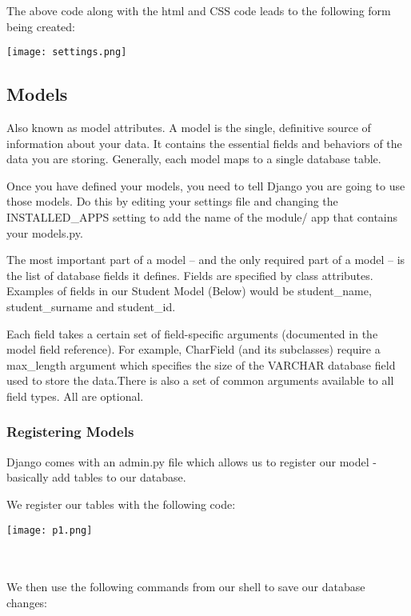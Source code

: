 \documentclass[10pt]{article}
\begin{document}
The above code along with the html and CSS code leads to the following form being created:

\begin{center}
\texttt{[image: settings.png]}
\end{center}


\subsection{Models}

Also known as model attributes. A model is the single, definitive source of information about your data. It contains the essential fields and behaviors of the data you are storing. Generally, each model maps to a single database table.

Once you have defined your models, you need to tell Django  you are going to use those models. Do this by editing your settings file and changing the INSTALLED\_APPS setting to add the name of the module/ app that contains your models.py.

The most important part of a model – and the only required part of a model – is the list of database fields it defines. Fields are specified by class attributes. Examples of fields in our Student Model (Below) would be student\_name, student\_surname and student\_id.

Each field takes a certain set of field-specific arguments (documented in the model field reference). For example, CharField (and its subclasses) require a max\_length argument which specifies the size of the VARCHAR database field used to store the data.There is also a set of common arguments available to all field types. All are optional.

\subsubsection{Registering Models}
Django comes with an admin.py file which allows us to register our model - basically add tables to our database.

We register our tables with the following code:

\begin{center}
\texttt{[image: p1.png]}
\end{center} \\ \\

We then use the following commands from our shell to save our database changes:
\end{document}
